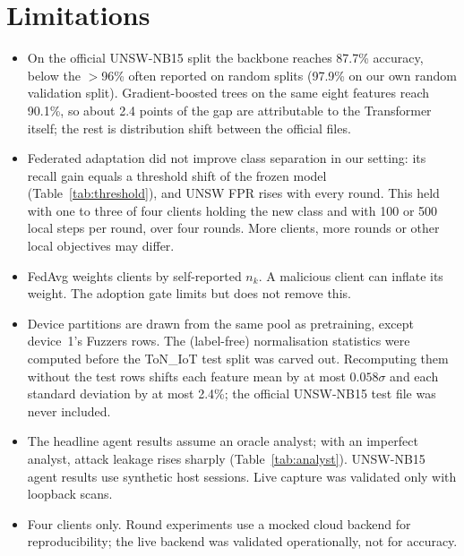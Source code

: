 \documentclass[conference]{IEEEtran}
\begin{document}
\section{Limitations}
\begin{itemize}
\item On the official UNSW-NB15 split the backbone reaches 87.7\% accuracy,
below the $>$96\% often reported on random splits (97.9\% on our own random
validation split). Gradient-boosted trees on the same eight features reach
90.1\%, so about 2.4 points of the gap are attributable to the Transformer
itself; the rest is distribution shift between the official files.
\item Federated adaptation did not improve class separation in our setting:
its recall gain equals a threshold shift of the frozen model
(Table~\ref{tab:threshold}), and UNSW FPR rises with every round. This held
with one to three of four clients holding the new class and with 100 or 500
local steps per round, over four rounds. More clients, more rounds or other
local objectives may differ.
\item FedAvg weights clients by self-reported $n_k$. A malicious client can
inflate its weight. The adoption gate limits but does not remove this.
\item Device partitions are drawn from the same pool as pretraining, except
device~1's Fuzzers rows. The (label-free) normalisation statistics were computed
before the ToN\_IoT test split was carved out. Recomputing them without the test
rows shifts each feature mean by at most $0.058\sigma$ and each standard deviation
by at most 2.4\%; the official UNSW-NB15 test file was never included.
\item The headline agent results assume an oracle analyst; with an
imperfect analyst, attack leakage rises sharply (Table~\ref{tab:analyst}).
UNSW-NB15 agent results use synthetic host sessions. Live capture was
validated only with loopback scans.
\item Four clients only. Round experiments use a mocked cloud backend for
reproducibility; the live backend was validated operationally, not for accuracy.
\end{itemize}
\end{document}
